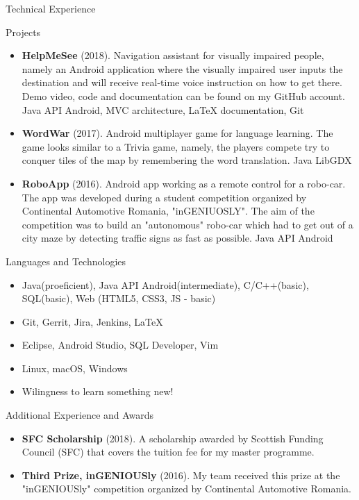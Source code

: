 \documentclass[]{mcdowellcv}
\begin{document}
	\begin{cvsection}{Technical Experience}
		\begin{cvsubsection}{Projects}{}{}
			\begin{itemize}
				\item \textbf{HelpMeSee} (2018). Navigation assistant for visually impaired people, namely an Android application where the visually impaired user inputs the destination and will receive real-time voice instruction on how to get there. Demo video, code and documentation can be found on my GitHub account. Java API Android, MVC architecture, LaTeX documentation, Git 
				\item \textbf{WordWar} (2017). Android multiplayer game for language learning. The game looks similar to a Trivia game, namely, the players compete try to conquer tiles of the map by remembering the word translation. Java LibGDX 
				\item \textbf{RoboApp} (2016). Android app working as a remote control for a robo-car. The app was developed during a student competition organized by Continental Automotive Romania, "inGENIUOSLY". The aim of the competition was to build an "autonomous" robo-car which had to get out of a city maze by detecting traffic signs as fast as possible. Java API Android
			\end{itemize}
		\end{cvsubsection}
	\end{cvsection}
	
		
	\begin{cvsection}{Languages and Technologies}
		\begin{cvsubsection}{}{}{}	
			\begin{itemize}
				\item Java(proeficient), Java API Android(intermediate), C/C++(basic), SQL(basic), Web (HTML5, CSS3, JS - basic) 
				\item Git, Gerrit, Jira, Jenkins, LaTeX
				\item Eclipse, Android Studio, SQL Developer, Vim
				\item Linux, macOS, Windows
				\item Wilingness to learn something new!
			\end{itemize}
		\end{cvsubsection}
	\end{cvsection}

	\pagebreak

	\begin{cvsection}{Additional Experience and Awards}
		\begin{cvsubsection}{}{}{}	
			\begin{itemize}
				\item \textbf{SFC Scholarship} (2018). A scholarship awarded by Scottish Funding Council (SFC) that covers the tuition fee for my master programme.
				\item \textbf{Third Prize, inGENIOUSly} (2016). My team received this prize at the "inGENIOUSly" competition organized by Continental Automotive Romania. 
			\end{itemize}
		\end{cvsubsection}
	\end{cvsection}
\end{document}
